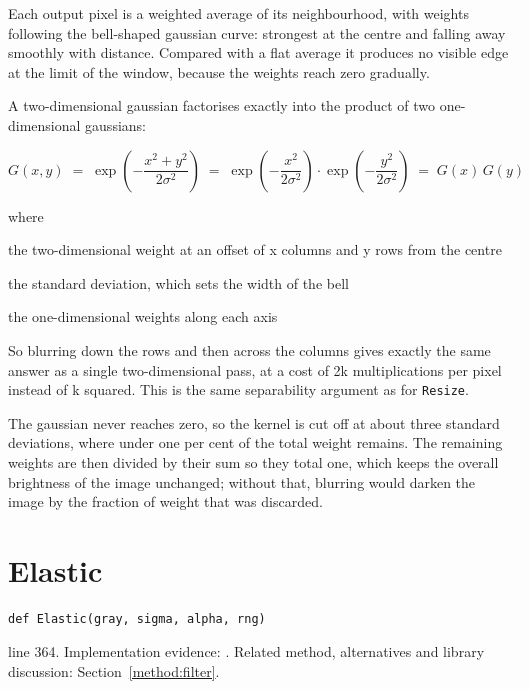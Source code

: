 Each output pixel is a weighted average of its neighbourhood, with weights following the bell-shaped gaussian curve: strongest at the centre and falling away smoothly with distance. Compared with a flat average it produces no visible edge at the limit of the window, because the weights reach zero gradually.


A two-dimensional gaussian factorises exactly into the product of two one-dimensional gaussians:


\begin{equation}
G(x,y) \;=\; \exp\!\left(-\frac{x^2 + y^2}{2\sigma^2}\right) \;=\; \exp\!\left(-\frac{x^2}{2\sigma^2}\right)\cdot\exp\!\left(-\frac{y^2}{2\sigma^2}\right) \;=\; G(x)\,G(y)
\end{equation}

\noindent where
\begin{description}[leftmargin=2.4em,style=nextline,font=\normalfont\ttfamily]\setlength\itemsep{1pt}
  \item[{$G(x,y)$}] \normalfont the two-dimensional weight at an offset of x columns and y rows from the centre
  \item[{$\sigma$}] \normalfont the standard deviation, which sets the width of the bell
  \item[{$G(x),\, G(y)$}] \normalfont the one-dimensional weights along each axis
\end{description}
So blurring down the rows and then across the columns gives exactly the same answer as a single two-dimensional pass, at a cost of 2k multiplications per pixel instead of k squared. This is the same separability argument as for \texttt{Resize}.


The gaussian never reaches zero, so the kernel is cut off at about three standard deviations, where under one per cent of the total weight remains. The remaining weights are then divided by their sum so they total one, which keeps the overall brightness of the image unchanged; without that, blurring would darken the image by the fraction of weight that was discarded.



\section{Elastic}\label{fn:segment:Elastic}
\begin{lstlisting}[style=sig]
def Elastic(gray, sigma, alpha, rng)
\end{lstlisting}
 line 364. Implementation evidence: \cite{code2026}. Related method, alternatives and library discussion: Section~\ref{method:filter}.


